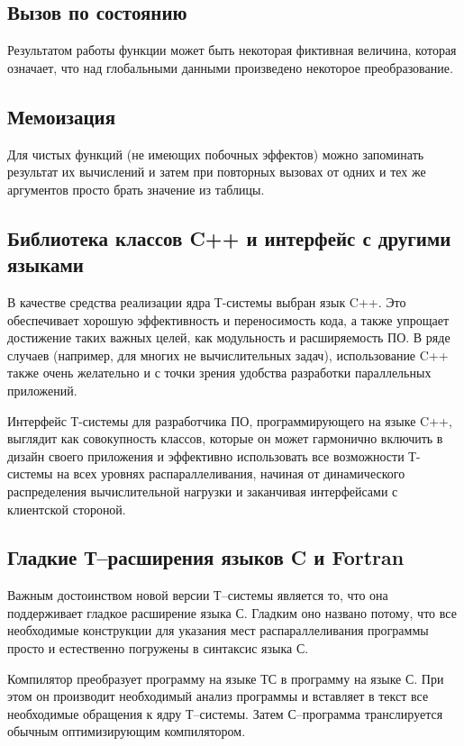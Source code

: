 \subsection{Вызов по состоянию}
Результатом работы функции может быть некоторая фиктивная величина,
которая означает, что над глобальными данными произведено некоторое
преобразование.

\subsection{Мемоизация}
Для чистых функций (не имеющих побочных эффектов) можно
запоминать результат их вычислений и затем при повторных
вызовах от одних и тех же аргументов просто брать значение из таблицы.

\subsection{Библиотека классов C++ и интерфейс с другими языками}
В качестве средства реализации ядра Т-системы выбран язык
C++.  Это обеспечивает хорошую эффективность и переносимость кода,
а также упрощает достижение таких важных целей, как модульность
и расширяемость ПО. В ряде случаев (например, для многих
не вычислительных задач), использование C++
также очень желательно и с точки зрения удобства разработки
параллельных приложений.

Интерфейс Т-системы для разработчика ПО, программирующего на языке
C++, выглядит как совокупность классов, которые он может гармонично
включить в дизайн своего приложения и эффективно использовать
все возможности Т-системы на всех уровнях распараллеливания,
начиная от динамического распределения вычислительной нагрузки
и заканчивая интерфейсами с клиентской стороной.

\subsection{Гладкие Т--расширения языков C и Fortran}
Важным достоинством новой версии Т--системы является то,
что она поддерживает гладкое расширение языка С. Гладким
оно названо потому, что все необходимые конструкции для
указания мест распараллеливания программы просто и естественно
погружены в синтаксис языка С.

Компилятор преобразует программу на языке ТС в программу на языке С.
При этом он производит необходимый анализ программы и вставляет в текст
все необходимые обращения к ядру Т--системы. Затем С--программа
транслируется обычным оптимизирующим компилятором.

